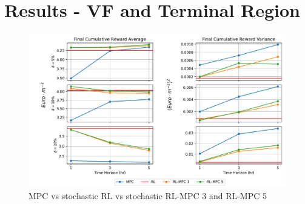 \section{Results - VF and Terminal Region}


\begin{figure}[H]
	\centering
	\includegraphics[width=\textwidth]{figures/stochastic_rl_vs_mpc_impl3.pdf}
	\caption{MPC vs stochastic RL vs stochastic RL-MPC 3 and RL-MPC 5}
	\label{fig:stochastic-mpv-vs-rl-rlmpc3-vs-rlmpc5}
\end{figure}

